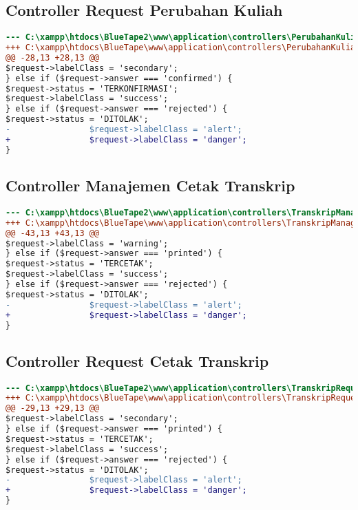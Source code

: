 \subsection{Controller Request Perubahan Kuliah}
\begin{lstlisting}[language=diff, caption=Controller Request Perubahan Kuliah, label=Entri, basicstyle=\ttfamily, frame=single,
columns=fullflexible, keepspaces=true, breaklines=true]
--- C:\xampp\htdocs\BlueTape2\www\application\controllers\PerubahanKuliahRequest.php
+++ C:\xampp\htdocs\BlueTape\www\application\controllers\PerubahanKuliahRequest.php
@@ -28,13 +28,13 @@
$request->labelClass = 'secondary';
} else if ($request->answer === 'confirmed') {
$request->status = 'TERKONFIRMASI';
$request->labelClass = 'success';
} else if ($request->answer === 'rejected') {
$request->status = 'DITOLAK';
-                $request->labelClass = 'alert';
+                $request->labelClass = 'danger';
}
\end{lstlisting}

\subsection{Controller Manajemen Cetak Transkrip}
\begin{lstlisting}[language=diff, caption=Controller Manajemen Cetak Transkrip, label=Entri, basicstyle=\ttfamily, frame=single,
columns=fullflexible, keepspaces=true, breaklines=true]
--- C:\xampp\htdocs\BlueTape2\www\application\controllers\TranskripManage.php
+++ C:\xampp\htdocs\BlueTape\www\application\controllers\TranskripManage.php
@@ -43,13 +43,13 @@
$request->labelClass = 'warning';
} else if ($request->answer === 'printed') {
$request->status = 'TERCETAK';
$request->labelClass = 'success';
} else if ($request->answer === 'rejected') {
$request->status = 'DITOLAK';
-                $request->labelClass = 'alert';
+                $request->labelClass = 'danger';
}
\end{lstlisting}

\subsection{Controller Request Cetak Transkrip}
\begin{lstlisting}[language=diff, caption=Controller Request Cetak Transkrip, label=Entri, basicstyle=\ttfamily, frame=single,
columns=fullflexible, keepspaces=true, breaklines=true]
--- C:\xampp\htdocs\BlueTape2\www\application\controllers\TranskripRequest.php	
+++ C:\xampp\htdocs\BlueTape\www\application\controllers\TranskripRequest.php	
@@ -29,13 +29,13 @@
$request->labelClass = 'secondary';
} else if ($request->answer === 'printed') {
$request->status = 'TERCETAK';
$request->labelClass = 'success';
} else if ($request->answer === 'rejected') {
$request->status = 'DITOLAK';
-                $request->labelClass = 'alert';
+                $request->labelClass = 'danger';
}
\end{lstlisting}



